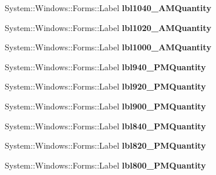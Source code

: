 \begin{DoxyCompactItemize}
\item 
\mbox{\label{class_project1_1_1_my_form_ae02d5bda3830b934fd3e8b629e4726f7}} 
System\+::\+Windows\+::\+Forms\+::\+Label {\bfseries lbl1040\+\_\+A\+M\+Quantity}
\item 
\mbox{\label{class_project1_1_1_my_form_a407741d1e57a68c76a743a42dfbc5810}} 
System\+::\+Windows\+::\+Forms\+::\+Label {\bfseries lbl1020\+\_\+A\+M\+Quantity}
\item 
\mbox{\label{class_project1_1_1_my_form_ad14649c68cdfe3a8a8d3523b42f0f251}} 
System\+::\+Windows\+::\+Forms\+::\+Label {\bfseries lbl1000\+\_\+A\+M\+Quantity}
\item 
\mbox{\label{class_project1_1_1_my_form_ad90ef724c1b1369d2e5b7be26bfa1b79}} 
System\+::\+Windows\+::\+Forms\+::\+Label {\bfseries lbl940\+\_\+P\+M\+Quantity}
\item 
\mbox{\label{class_project1_1_1_my_form_a07349d92db77ae5fb40a5b6b1142ec1a}} 
System\+::\+Windows\+::\+Forms\+::\+Label {\bfseries lbl920\+\_\+P\+M\+Quantity}
\item 
\mbox{\label{class_project1_1_1_my_form_a4ac5cd3aaaebdd2948850aa18d09fa47}} 
System\+::\+Windows\+::\+Forms\+::\+Label {\bfseries lbl900\+\_\+P\+M\+Quantity}
\item 
\mbox{\label{class_project1_1_1_my_form_a4bfd414b89a872a0afc1597fb9c1fe98}} 
System\+::\+Windows\+::\+Forms\+::\+Label {\bfseries lbl840\+\_\+P\+M\+Quantity}
\item 
\mbox{\label{class_project1_1_1_my_form_a498516e70e0637e5b754794f34495f10}} 
System\+::\+Windows\+::\+Forms\+::\+Label {\bfseries lbl820\+\_\+P\+M\+Quantity}
\item 
\mbox{\label{class_project1_1_1_my_form_ab4ec479e5880feca3289aaeb3df83813}} 
System\+::\+Windows\+::\+Forms\+::\+Label {\bfseries lbl800\+\_\+P\+M\+Quantity}
\item 

\end{DoxyCompactItemize}

